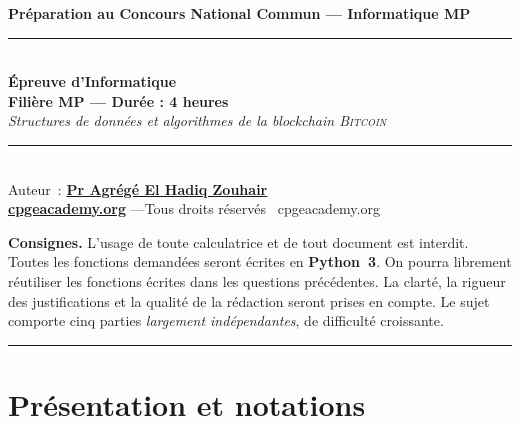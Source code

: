 \documentclass[11pt,a4paper]{article}
\begin{document}
\begin{center}
{\large\bfseries Préparation au Concours National Commun --- Informatique MP}\\[8pt]
\rule{0.9\linewidth}{0.5pt}\\[6pt]
{\Large\bfseries Épreuve d'Informatique}\\[4pt]
{\bfseries Filière MP --- Durée : 4 heures}\\[6pt]
{\itshape Structures de données et algorithmes de la blockchain \textsc{Bitcoin}}\\[6pt]
\rule{0.9\linewidth}{0.5pt}\\[8pt]
{\small Auteur~: \href{https://orcid.org/0000-0002-6108-7176}{\textbf{Pr Agrégé El Hadiq Zouhair}}}\\[3pt]
{\small \href{https://cpgeacademy.org}{\textbf{cpgeacademy.org}} \quad---\quad Tous droits réservés \textcopyright\ cpgeacademy.org}
\end{center}

\medskip
\begin{center}
\end{center}

\vspace{4pt}
\noindent
\textbf{Consignes.} L'usage de toute calculatrice et de tout document est interdit. Toutes les fonctions demandées seront écrites en \textbf{Python~3}. On pourra librement réutiliser les fonctions écrites dans les questions précédentes. La clarté, la rigueur des justifications et la qualité de la rédaction seront prises en compte. Le sujet comporte cinq parties \emph{largement indépendantes}, de difficulté croissante.

\medskip
\hrule
\medskip

\section*{Présentation et notations}
\end{document}
